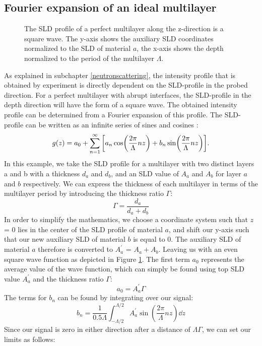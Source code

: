 \subsection{Fourier expansion of an ideal multilayer}
\begin{figure}[b]
	\centering
	\def\svgwidth{\textwidth}
	
	\caption{The SLD profile of a perfect multilayer along the z-direction is a square wave. The y-axis shows the auxiliary SLD coordinates normalized to the SLD of material $a$, the x-axis shows the depth normalized to the period of the multilayer $\Lambda$.}
	\label{square_wave}
\end{figure}
As explained in subchapter \ref{neutronscattering}, the intensity profile that is obtained by experiment is directly dependent on the SLD-profile in the probed direction. For a perfect multilayer with abrupt interfaces, the SLD-profile in the depth direction will have the form of a square wave. The obtained intensity profile can be determined from a Fourier expansion of this profile. The SLD-profile can be written as an infinite series of sines and cosines \cite{kittel}:
\begin{equation}\label{fourier_expansion_general}
	g(z) = a_0 + \sum_{n=1}^{ \infty } \qty [ a_n \cos(\frac{2\pi}{\Lambda}nz) + b_n \sin(\frac{2\pi}{\Lambda}nz)].
\end{equation}
In this example, we take the SLD profile for a multilayer with two distinct layers a and b with a thickness $d_a$ and $d_b$, and an SLD value of $A_a$ and $A_b$ for layer $a$ and $b$ respectively. We can express the thickness of each multilayer in terms of the multilayer period by introducing the thickness ratio $\Gamma$:
\begin{equation}
	\Gamma = \frac{d_a}{d_a+d_b}
\end{equation}
In order to simplify the mathematics, we choose a coordinate system such that $z$ = 0 lies in the center of the SLD profile of material $a$, and shift our y-axis such that our new auxiliary SLD of material $b$ is equal to 0. The auxiliary SLD of material $a$ therefore is converted to $A_a^\prime$ = $A_a + A_b$. Leaving us with an even square wave function as depicted in Figure \ref{square_wave}. The first term $a_0$ represents the average value of the wave function, which can simply be found using top SLD value $A_a^\prime$ and the thickness ratio $\Gamma$:
\begin{equation}
	a_0 = A_a^\prime\Gamma
\end{equation}
The terms for $b_n$ can be found by integrating over our signal:
\begin{equation}
	b_n = \frac{1}{0.5\Lambda}\int_{-\Lambda/2}^{\Lambda/2} A_a^\prime \sin(\frac{2\pi}{\Lambda}nz) \dd z
\end{equation}
Since our signal is zero in either direction after a distance of $\Lambda \Gamma$, we can set our limits as follows:

